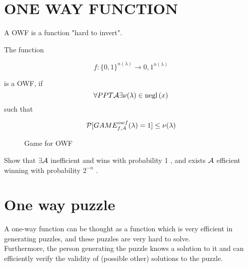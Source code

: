 \section{ONE WAY FUNCTION}
A OWF is a function "hard to invert".
\begin{definition}
    
The function 

\begin{equation}
    f:\{0,1\}^{n(\lambda)} \to {0,1}^{n(\lambda)} 
\end{equation}

is a OWF, if 
\begin{equation}
    \forall  PPT  \A   \exists   \nu(\lambda) \in \negl{x}
\end{equation}
such that

\begin{equation}
    \P [ GAME_{f,A}^{owf} (\lambda)=1 ] \le \nu(\lambda)   
\end{equation}

\end{definition}


\begin{figure}[h!]
   \centering
   \sdinit{}
   \caption{Game for OWF}
   \label{fig:game_owf}
\end{figure}

\begin{exercise}
Show that $\exists  \Adv$
inefficient and wins with probability 1 ,  and exists $\Adv$ efficient winning
with probability $2^{-n}$ .
\end{exercise}

\newpage

\section{One way puzzle}
A one-way function can be thought as a function which is very efficient in
generating puzzles, and these puzzles are very hard to solve.\\
Furthermore, the person generating the puzzle knows a solution to it and can
efficiently verify the validity of (possible other) solutions to the puzzle.\\

